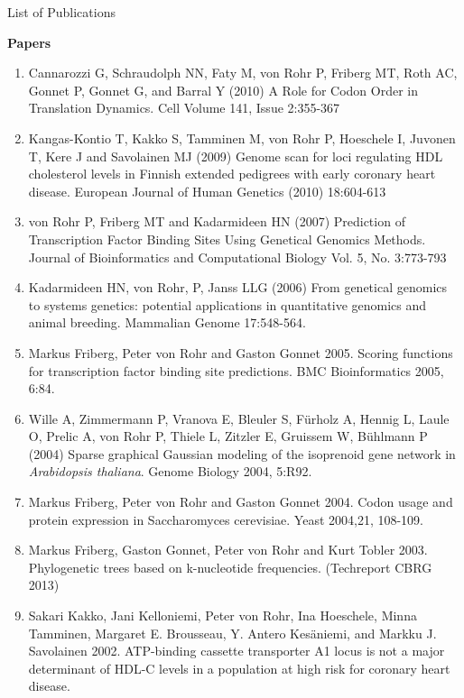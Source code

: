 \documentclass[11pt,a4paper]{scrartcl}
\date{}
\begin{document}
\begin{center}
  \Large{List of Publications}
\end{center}

\textbf{Papers} \\
\begin{enumerate}
\item Cannarozzi G, Schraudolph NN, Faty M, von Rohr P, Friberg MT, Roth AC, Gonnet P, 
  Gonnet G, and Barral Y (2010)
  A Role for Codon Order in Translation Dynamics.
  Cell Volume 141, Issue 2:355-367 
\item Kangas-Kontio T, Kakko S, Tamminen M, von Rohr P, Hoeschele I, Juvonen T, Kere J 
  and Savolainen MJ (2009)
  Genome scan for loci regulating HDL cholesterol levels in Finnish extended pedigrees 
  with early coronary heart disease.
  European Journal of Human Genetics (2010) 18:604-613
\item von Rohr P, Friberg MT and Kadarmideen HN (2007)
  Prediction of Transcription Factor Binding Sites Using Genetical Genomics Methods. 
  Journal of Bioinformatics and Computational Biology Vol. 5, No. 3:773-793
\item Kadarmideen HN, von Rohr, P, Janss LLG (2006) 
  From genetical genomics to systems genetics: potential applications in 
  quantitative genomics and animal breeding. Mammalian Genome 17:548-564.
\item Markus Friberg, Peter von Rohr and Gaston Gonnet 2005. 
  Scoring functions for transcription factor binding site predictions. 
  BMC Bioinformatics 2005, 6:84.
\item Wille A, Zimmermann P, Vranov\/a E, Bleuler S,   F\"urholz A, Hennig L, 
  Laule O, Prel\/ic A, von Rohr P, Thiele L, Zitzler E, Gruissem W, B\"uhlmann P (2004) 
  Sparse graphical Gaussian modeling of the isoprenoid gene network in 
  \textit{Arabidopsis thaliana}. Genome Biology 2004, 5:R92.
\item Markus Friberg, Peter von Rohr and Gaston Gonnet 2004. 
  Codon usage and protein expression in Saccharomyces cerevisiae. 
  Yeast 2004,21, 108-109.
\item Markus Friberg, Gaston Gonnet, Peter von Rohr and Kurt Tobler 2003. 
  Phylogenetic trees based on k-nucleotide frequencies. 
  (Techreport CBRG 2013)
\item Sakari Kakko, Jani Kelloniemi, Peter von Rohr, Ina Hoeschele, Minna 
  Tamminen, Margaret E. Brousseau, Y. Antero Kes\"aniemi, and Markku J. 
  Savolainen 2002. 
  ATP-binding cassette transporter A1 locus is not a major determinant of 
  HDL-C levels in a population at high risk for coronary heart disease. 

\end{enumerate}
\end{document}
